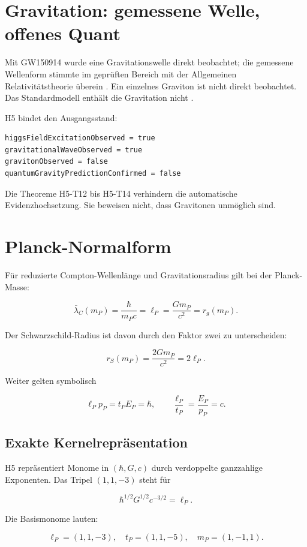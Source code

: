 \documentclass[11pt,a4paper]{article}
\begin{document}
\section{Gravitation: gemessene Welle, offenes Quant}

Mit GW150914 wurde eine Gravitationswelle direkt beobachtet; die gemessene
Wellenform stimmte im geprüften Bereich mit der Allgemeinen Relativitätstheorie
überein \cite{ligo2016}. Ein einzelnes Graviton ist nicht direkt beobachtet.
Das Standardmodell enthält die Gravitation nicht \cite{cernsm}.

H5 bindet den Ausgangsstand:

\begin{lstlisting}
higgsFieldExcitationObserved = true
gravitationalWaveObserved = true
gravitonObserved = false
quantumGravityPredictionConfirmed = false
\end{lstlisting}

Die Theoreme H5-T12 bis H5-T14 verhindern die automatische Evidenzhochsetzung.
Sie beweisen nicht, dass Gravitonen unmöglich sind.

\section{Planck-Normalform}

Für reduzierte Compton-Wellenlänge und Gravitationsradius gilt bei der
Planck-Masse:

\[
\bar\lambda_C(m_P)
=\frac{\hbar}{m_Pc}
=\ell_P
=\frac{Gm_P}{c^2}
=r_g(m_P).
\]

Der Schwarzschild-Radius ist davon durch den Faktor zwei zu unterscheiden:

\[
r_S(m_P)=\frac{2Gm_P}{c^2}=2\ell_P.
\]

Weiter gelten symbolisch

\[
\ell_Pp_P=t_PE_P=\hbar,
\qquad
\frac{\ell_P}{t_P}=\frac{E_P}{p_P}=c.
\]

\subsection{Exakte Kernelrepräsentation}

H5 repräsentiert Monome in \((\hbar,G,c)\) durch verdoppelte ganzzahlige
Exponenten. Das Tripel \((1,1,-3)\) steht für

\[
\hbar^{1/2}G^{1/2}c^{-3/2}=\ell_P.
\]

Die Basismonome lauten:

\[
\ell_P=(1,1,-3),\quad
t_P=(1,1,-5),\quad
m_P=(1,-1,1).
\]
\end{document}
